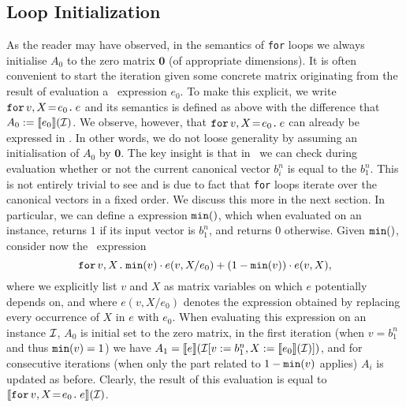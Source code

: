 \subsection{Loop Initialization} As the reader may have observed, in the semantics of \texttt{for} loops we 
always initialise $A_0$ to the zero matrix $\mathbf{0}$ (of appropriate dimensions). It is often convenient
to start the iteration given some concrete matrix  originating from the result of evaluation a \langfor\ expression $e_0$. To make this explicit, we write $\initf{e_0}{v}{X}{e}$ and its semantics is defined as above
with the difference that $A_0:=\sem{e_0}{\I}$. We observe, however, that $\initf{e_0}{v}{X}{e}$ can already
be expressed in \langfor. In other words, we do not loose generality by assuming an initialisation of $A_0$ by $\mathbf{0}$.
The key insight is that in \langfor\ we can check during evaluation whether or not
the current canonical vector $b_i^n$ is equal to the $b_1^n$. This is not entirely trivial to see and is due to fact that \texttt{for} loops iterate over the canonical vectors in a fixed order. We discuss this more in the next section. In particular, we can define a \langfor expression $\mmin$, which when evaluated on an instance, returns $1$ if its input vector is $b_1^n$, and returns $0$ otherwise. Given $\mmin$, consider now the
\langfor\ expression
 $$\ffor{v}{X}{\mmin{v}\cdot e(v,X/e_0) + (1-\mmin{v})\cdot e(v,X)},$$
 where we explicitly list $v$ and $X$ as matrix variables on which $e$ potentially depends on, and where
 $e(v,X/e_0)$ denotes the expression obtained by replacing every occurrence of $X$ in $e$ with $e_0$.
%
When evaluating this expression on an instance $\I$, $A_0$ is initial set to the zero matrix, in the first iteration (when  $v=b_1^n$ and thus $\mmin{v}=1$)
we have $A_1=\sem{e}{\I[v:=b_1^n,X:=\sem{e_0}{\I}]}$, and for consecutive iterations (when only the part related to $1-\mmin{v}$ applies) $A_i$ is updated as before. Clearly, the result of this evaluation is equal to
$\sem{\initf{e_0}{v}{X}{e}}{\I}$. 

